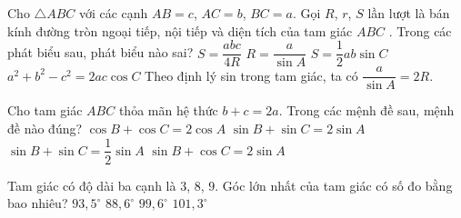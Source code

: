 \begin{ex}
	Cho $\triangle ABC$ với các cạnh $AB=c$, $AC=b$, $BC=a$. Gọi $R$, $r$, $S$ lần lượt là bán kính đường tròn ngoại tiếp, nội tiếp và diện tích của tam giác $ABC$ . Trong các phát biểu sau, phát biểu nào sai?
	\choice
	{$S=\dfrac{abc}{4R}$ }
	{\True $R=\dfrac{a}{\sin A}$ }
	{$S=\dfrac{1}{2}ab\sin C$ }
	{$a^2+b^2-c^2=2ac\cos C$}
	\loigiai
	{
		Theo định lý sin trong tam giác, ta có $\dfrac{a}{\sin A}=2R$.
	}
\end{ex}
\begin{ex}
	Cho tam giác $ABC$ thỏa mãn hệ thức $b+c=2a$. Trong các mệnh đề sau, mệnh đề nào đúng?
	\choice
	{$\cos B+\cos C=2\cos A$}
	{\True $\sin B+\sin C=2\sin A$}
	{$\sin B+\sin C=\dfrac{1}{2}\sin A$}
	{$\sin B+\cos C=2\sin A$}
\end{ex}
\begin{ex}
	Tam giác có độ dài ba cạnh là $3$, $8$, $9$. Góc lớn nhất của tam giác có số đo bằng bao nhiêu?
	\choice
	{$93{,}5^\circ$}
	{$88{,}6^\circ$}
	{\True $99{,}6^\circ$}
	{$101{,}3^\circ$}
\end{ex}
